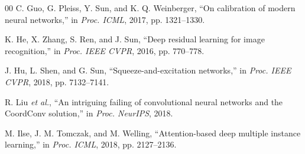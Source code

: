 \documentclass[conference]{IEEEtran}
\begin{document}
\begin{thebibliography}{00}
 C. Guo, G. Pleiss, Y. Sun, and K. Q. Weinberger, ``On calibration of modern neural networks,'' in \textit{Proc. ICML}, 2017, pp. 1321--1330.

 K. He, X. Zhang, S. Ren, and J. Sun, ``Deep residual learning for image recognition,'' in \textit{Proc. IEEE CVPR}, 2016, pp. 770--778.

 J. Hu, L. Shen, and G. Sun, ``Squeeze-and-excitation networks,'' in \textit{Proc. IEEE CVPR}, 2018, pp. 7132--7141.

 R. Liu \textit{et al.}, ``An intriguing failing of convolutional neural networks and the CoordConv solution,'' in \textit{Proc. NeurIPS}, 2018.

 M. Ilse, J. M. Tomczak, and M. Welling, ``Attention-based deep multiple instance learning,'' in \textit{Proc. ICML}, 2018, pp. 2127--2136.

\end{thebibliography}
\end{document}
